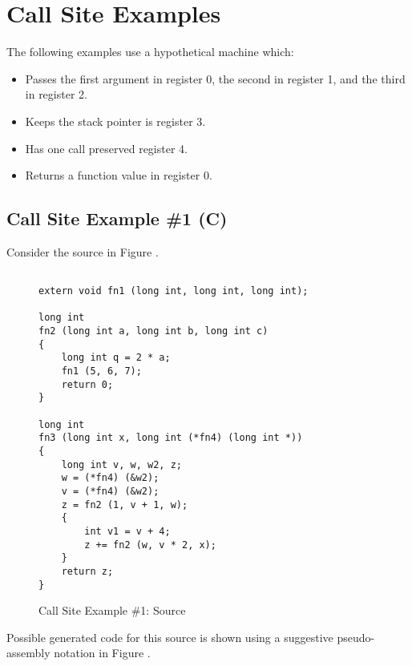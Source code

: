 \clearpage
\section{Call Site Examples}
\label{app:callsiteexamples}
The following examples use a hypothetical machine which: 
\begin{itemize}
\item
Passes the first argument in register 0, the second in register 1, and the third in register 2.
\item
Keeps the stack pointer is register 3.
\item
Has one call preserved register 4.
\item
Returns a function value in register 0.
\end{itemize}

\subsection{Call Site Example \#1 (C)}
Consider the  source in Figure .

\begin{figure}[h]
\begin{lstlisting}

extern void fn1 (long int, long int, long int);

long int
fn2 (long int a, long int b, long int c) 
{
    long int q = 2 * a;
    fn1 (5, 6, 7); 
    return 0;
}
 
long int
fn3 (long int x, long int (*fn4) (long int *))
{
    long int v, w, w2, z;
    w = (*fn4) (&w2);
    v = (*fn4) (&w2);
    z = fn2 (1, v + 1, w);
    {
        int v1 = v + 4;
        z += fn2 (w, v * 2, x);
    }
    return z;
}
\end{lstlisting}
\caption{Call Site Example \#1: Source}
\label{fig:callsiteexample1source}
\end{figure}

Possible generated code for this source is shown using a suggestive 
pseudo-\linebreak[0]assembly notation in Figure .

